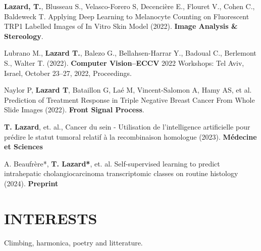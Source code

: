 \documentclass[margin]{res}
\begin{document}
\begin{resume}
\textbf{Lazard, T.}, Blusseau S., Velasco-Forero S, Decenci\`ere E., Flouret V., Cohen C., Baldeweck T.
Applying Deep Learning to Melanocyte Counting on Fluorescent TRP1 Labelled Images of In Vitro Skin Model (2022). 
\textbf{Image Analysis & Stereology}.
\par
Lubrano M., \textbf{Lazard T.}, Balezo G., Bellahsen-Harrar Y., Badoual C., Berlemont S., Walter T. (2022).
\textbf{Computer Vision–ECCV} 2022 Workshops: Tel Aviv, Israel, October 23–27, 2022, Proceedings.
\par
Naylor P, \textbf{Lazard T}, Bataillon G, Laé M, Vincent-Salomon A, Hamy AS, et al. Prediction of Treatment
Response in Triple Negative Breast Cancer From Whole Slide Images (2022). \textbf{Front Signal Process}.
\par
\textbf{T. Lazard}, et. al., Cancer du sein - Utilisation de l’intelligence artificielle pour prédire le statut tumoral relatif à la recombinaison homologue (2023). \textbf{Médecine et Sciences}
\par
A. Beaufr\`ere*, \textbf{T. Lazard*}, et. al. Self-supervised learning to predict intrahepatic cholangiocarcinoma transcriptomic classes on routine histology (2024). \textbf{Preprint}
\\

\section{INTERESTS}
Climbing, harmonica, poetry and litterature. 
\end{resume}
\end{document}
